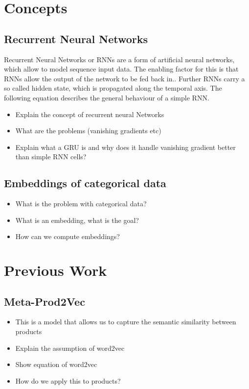 \section{Concepts}
\subsection{Recurrent Neural Networks}\label{rnn}
Recurrent Neural Networks or RNNs are a form of artificial neural networks, which allow to model sequence input data.
The enabling factor for this is that RNNs allow the output of the network to be fed back in..
Further RNNs carry a so called hidden state, which is propagated along the temporal axis.
The following equation describes the general behaviour of a simple RNN.
\[
    
\]
\begin{itemize}
    \item Explain the concept of recurrent neural Networks
    \item What are the problems (vanishing gradients etc)
    \item Explain what a GRU is and why does it handle vanishing gradient better than simple RNN cells?
\end{itemize}
\subsection{Embeddings of categorical data}
\begin{itemize}
    \item What is the problem with categorical data?
    \item What is an embedding, what is the goal?
    \item How can we compute embeddings?
\end{itemize}

\section{Previous Work}
\subsection{Meta-Prod2Vec}
\begin{itemize}
    \item This is a model that allows us to capture the semantic similarity between products
    \item Explain the assumption of word2vec
    \item Show equation of word2vec
    \item How do we apply this to products?
\end{itemize}
\cite{prod2vec}

